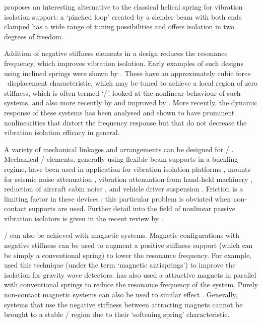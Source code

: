 \textcite{virgin2008} proposes an interesting alternative to the classical helical spring for vibration isolation support: a `pinched loop' created by a slender beam with both ends clamped has a wide range of tuning possibilities and offers isolation in two degrees of freedom.


Addition of negative stiffness elements in a design reduces the resonance frequency, which improves vibration isolation.
Early examples of such designs using inclined springs were shown by \textcite{molyneux1957}.
These have an approximately cubic force \vs\ displacement characteristic, which may be tuned to achieve a local region of zero stiffness, which is often termed `\qzs/'.
\textcite{alabuzhev1989} looked at the nonlinear behaviour of such
systems, and also more recently by
\textcite{carrella2006,carrella2007-jsv,carrella2008-jsv,carrella2009} and improved by
\textcite{kovacic2008}.
More recently, the dynamic response of these systems has been analysed \parencite{carrella2009,carrella2008-thesis} and shown to have prominent nonlinearities that distort the frequency response but that do not decrease the vibration isolation efficacy in general.

A variety of mechanical linkages and arrangements can be designed for \qzs/ \cite{tarnai2003}.
Mechanical \qzs/ elements, generally using flexible beam supports in a buckling regime, have been used in application for vibration isolation platforms \cite{platus1999}, mounts for seismic noise attenuation \cite{cella2005}, vibration attenuation from hand-held machinery \cite{sokolov2007}, reduction of aircraft cabin noise \cite{baklanov2007-jsv}, and vehicle driver suspension \cite{lee2007-jsv}.
Friction is a limiting factor in these devices \cite{sokolov2007}; this particular problem is obviated when non-contact supports are used.
Further detail into the field  of nonlinear passive vibration isolators is given in the recent review by \textcite{ibrahim2008}.

\QZS/ can also be achieved with magnetic systems.
Magnetic configurations with negative stiffness can be used to augment a positive stiffness support (which can be simply a conventional spring) to lower the resonance frequency.
For example, \textcite{beccaria1997} used this technique (under the term `magnetic antisprings') to improve the isolation for gravity wave detectors.
\textcite{carrella2007-euromech,carrella2008-thesis} has also used a attractive magnets in parallel with conventional springs to reduce the resonance frequency of the system.
Purely non-contact magnetic systems can also be used to similar effect \cite{robertson2006,robertson2007}.
Generally, systems that use the negative stiffness between attracting magnets cannot be brought to a stable \qzs/ region due to their `softening spring' characteristic.

